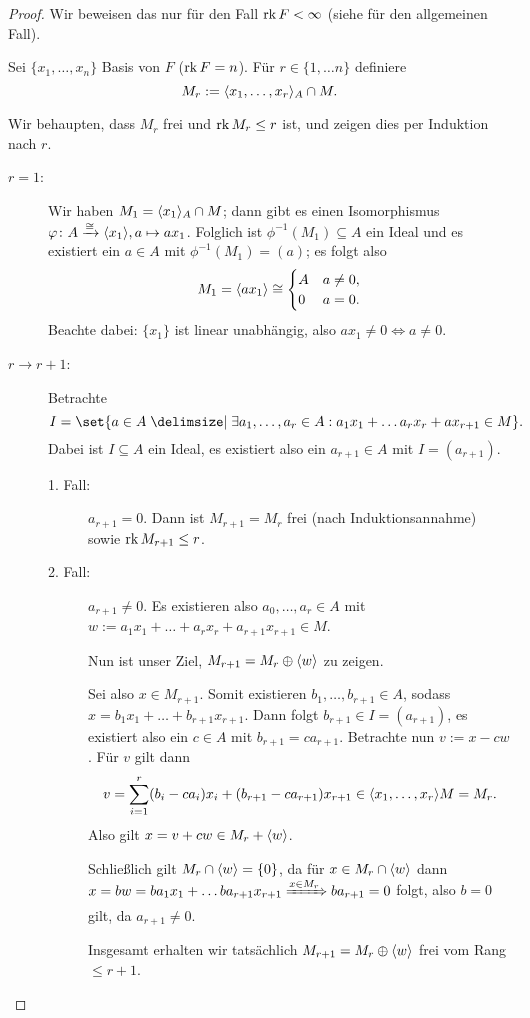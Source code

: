 \documentclass[12pt,a4paper]{scrartcl}
\theoremstyle{cplain}
\theoremstyle{cdef}
\begin{document}
\begin{proof}
	Wir beweisen das nur für den Fall $\operatorname{rk} F<\infty$ (siehe \cite[Theorem 6.1]{hungerford} für den allgemeinen Fall).
	
	Sei $\{x_1,\dots, x_n\}$ Basis von $F$ ($\operatorname{rk} F = n$). Für $r\in\{1,\dots n\}$ definiere
	\[M_r := \langle x_1,\dots, x_r\rangle_A\cap M.\]
	
	Wir behaupten, dass $M_r$ frei und $\operatorname{rk} M_r \le r$ ist, und zeigen dies per Induktion nach $r$.
	\begin{description}
		\item[$r = 1$:] Wir haben $M_1 = \langle x_1\rangle_A\cap M$; dann gibt es einen Isomorphismus $\varphi\colon A\xrightarrow{\cong} \langle x_1\rangle, a\mapsto ax_1$. Folglich ist $\phi^{-1}(M_1)\subseteq A$ ein Ideal und es existiert ein $a\in A$ mit $\phi^{-1}(M_1) = (a)$; es folgt also \[M_1 = \langle ax_1\rangle \cong \begin{cases} A & a\neq 0,\\ 0& a= 0.\end{cases}\] %
		Beachte dabei: $\{x_1\}$ ist linear unabhängig, also $ax_1\neq 0 \Leftrightarrow a\neq 0$.
		\item[$r\to r+1$:] Betrachte
		\[ I = \set{a\in A \given \exists a_1,\dots, a_r\in A: a_1x_1+\dots a_rx_r+ax_{r+1}\in M}. \]
		Dabei ist $I\subseteq A$ ein Ideal, es existiert also ein $a_{r+1}\in A$ mit $I = (a_{r+1})$.
		\begin{description}
			\item[1. Fall:] $a_{r+1} = 0$. Dann ist $M_{r+1} = M_r$ frei (nach Induktionsannahme) sowie $\operatorname{rk} M_{r+1}\le r$.
			\item[2. Fall:] $a_{r+1}\neq 0$. Es existieren also $a_0,\dots, a_r\in A$ mit $w := a_1x_1+\dots+a_rx_r+a_{r+1}x_{r+1}\in M$.
			
			Nun ist unser Ziel, $M_{r+1} = M_r\oplus \langle w\rangle$ zu zeigen.
			
			Sei also $x\in M_{r+1}$. Somit existieren $b_1,\dots, b_{r+1}\in A$, sodass $x = b_1x_1+\dots + b_{r+1}x_{r+1}$. Dann folgt $b_{r+1}\in I = (a_{r+1})$, es existiert also ein $c\in A$ mit $b_{r+1} = ca_{r+1}$. Betrachte nun $v := x-cw$. Für $v$ gilt dann
			\[v= \sum_{i = 1}^r (b_i-ca_i)x_i+(b_{r+1}-ca_{r+1})x_{r+1}\in \langle x_1,\dots, x_r\rangle M = M_r.\]
			Also gilt $x = v+cw\in M_r+\langle w\rangle$.
			
			Schließlich gilt $M_r\cap\langle w\rangle = \{0\}$, da für $x\in M_r\cap\langle w\rangle$ dann $x = bw = ba_1x_1+\dots ba_{r+1}x_{r+1}\xRightarrow{x\in M_r} ba_{r+1} = 0$ folgt, also $b = 0$ gilt, da $a_{r+1} \neq 0$.
			
			Insgesamt erhalten wir tatsächlich $M_{r+1} = M_r\oplus \langle w\rangle$ frei vom Rang $\le r+1$. \qedhere 
		\end{description}
	\end{description}
	
\end{proof}
\end{document}
